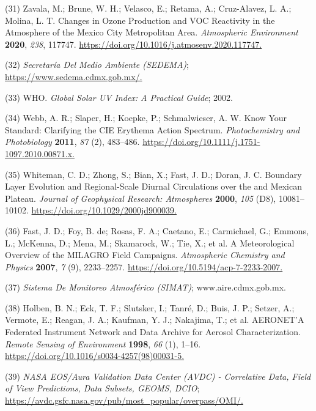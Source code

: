 \documentclass[10pt]{article}
\begin{document}
\label{csl:31}(31) Zavala, M.; Brune, W. H.; Velasco, E.; Retama, A.; Cruz-Alavez, L. A.; Molina, L. T. {Changes in Ozone Production and {VOC} Reactivity in the Atmosphere of the Mexico City Metropolitan Area}. \textit{Atmospheric Environment} \textbf{2020}, \textit{238}, 117747. \url{https://doi.org/10.1016/j.atmosenv.2020.117747.}

\label{csl:32}(32) \textit{{Secretaría Del Medio Ambiente (SEDEMA)}}; \url{https://www.sedema.cdmx.gob.mx/.}

\label{csl:33}(33) WHO. \textit{{Global Solar UV Index: A Practical Guide}}; 2002.

\label{csl:34}(34) Webb, A. R.; Slaper, H.; Koepke, P.; Schmalwieser, A. W. {Know Your Standard: Clarifying the {CIE} Erythema Action Spectrum}. \textit{Photochemistry and Photobiology} \textbf{2011}, \textit{87} (2), 483–486. \url{https://doi.org/10.1111/j.1751-1097.2010.00871.x.}

\label{csl:35}(35) Whiteman, C. D.; Zhong, S.; Bian, X.; Fast, J. D.; Doran, J. C. {Boundary Layer Evolution and Regional-Scale Diurnal Circulations over the and Mexican Plateau}. \textit{Journal of Geophysical Research: Atmospheres} \textbf{2000}, \textit{105} (D8), 10081–10102. \url{https://doi.org/10.1029/2000jd900039.}

\label{csl:36}(36) Fast, J. D.; Foy, B. de; Rosas, F. A.; Caetano, E.; Carmichael, G.; Emmons, L.; McKenna, D.; Mena, M.; Skamarock, W.; Tie, X.; et al. {A Meteorological Overview of the {MILAGRO} Field Campaigns}. \textit{Atmospheric Chemistry and Physics} \textbf{2007}, \textit{7} (9), 2233–2257. \url{https://doi.org/10.5194/acp-7-2233-2007.}

\label{csl:37}(37) \textit{{Sistema De Monitoreo Atmosférico (SIMAT)}}; www.aire.cdmx.gob.mx.

\label{csl:38}(38) Holben, B. N.; Eck, T. F.; Slutsker, I.; Tanr{\'{e}}, D.; Buis, J. P.; Setzer, A.; Vermote, E.; Reagan, J. A.; Kaufman, Y. J.; Nakajima, T.; et al. {{AERONET}'A Federated Instrument Network and Data Archive for Aerosol Characterization}. \textit{Remote Sensing of Environment} \textbf{1998}, \textit{66} (1), 1–16. \url{https://doi.org/10.1016/s0034-4257(98)00031-5.}

\label{csl:39}(39) \textit{{NASA EOS/Aura Validation Data Center (AVDC) - Correlative Data, Field of View Predictions, Data Subsets, GEOMS, DCIO}}; \url{https://avdc.gsfc.nasa.gov/pub/most_popular/overpass/OMI/.}
\end{document}
